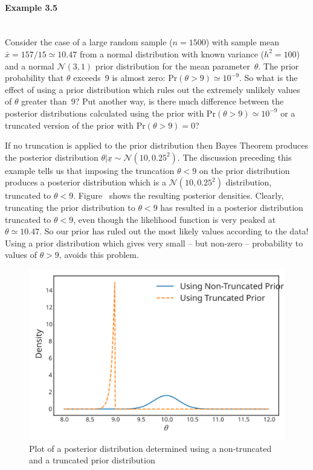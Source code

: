 \paragraph{Example 3.5}{~\\
Consider the case of a large random sample ($n=1500$) with sample mean
$\bar x=157/15\simeq 10.47$ from a normal distribution with known
variance ($h^2=100$) and a normal $\mathcal{N}(3,1)$ prior distribution for the
mean parameter~$\theta$. The prior probability that $\theta$ exceeds~9
is almost zero: $\text{Pr}(\theta>9)\simeq 10^{-9}$. So what is the effect of
using a prior distribution which rules out the extremely unlikely
values of $\theta$ greater than~9? Put another way, is there much
difference between the posterior distributions calculated using the
prior with $\text{Pr}(\theta>9)\simeq 10^{-9}$ or a truncated version of the
prior with $\text{Pr}(\theta>9)=0$?

If no truncation is applied to the prior distribution then Bayes
Theorem produces the posterior distribution $\theta|\underline{x}\sim \mathcal{N}(10,0.25^2)$. The discussion preceding this example tells us that imposing the truncation $\theta<9$ on the prior distribution produces a posterior distribution which is a $\mathcal{N}(10,0.25^2)$ distribution, truncated to $\theta<9$.  Figure~ shows the resulting posterior densities. Clearly, truncating the prior distribution to $\theta<9$ has resulted in a posterior distribution truncated to $\theta<9$, even though the likelihood function is very peaked at $\theta\simeq 10.47$. So our prior has ruled out the most likely values according to the data! Using a prior distribution which gives very small -- but non-zero -- probability to values of $\theta>9$, avoids this problem.
\begin{figure}[h!]

\includegraphics{images/truncposterior2.svg}
\caption{Plot of a posterior distribution determined using a
non-truncated and a truncated prior distribution}
\label{fig:posttrunc2}

\end{figure}}

